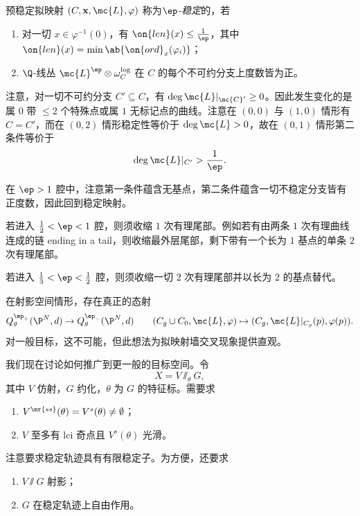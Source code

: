 \begin{defn}
    预稳定拟映射 \((C, \mathbf{x}, \mc{L}, \varphi)\) 称为\textit{\(\ep\)-稳定}的，若
    \begin{enumerate}
        \item 对一切 \(x \in \varphi^{-1}(0)\)，有 \(\on{len}(x) \leq \frac{1}{\ep}\)，其中 \(\on{len}(x) = \min \ab\{ \on{ord}_x (\varphi_i)\}\)；
        \item \(\Q\)-线丛 \(\mc{L}^{\ep} \otimes \omega_C^{\log}\) 在 \(C\) 的每个不可约分支上度数皆为正。
    \end{enumerate}
\end{defn}

注意，对一切不可约分支 \(C' \subseteq C\)，有 \(\deg \mc{L}|_{\mc{C}'} \geq 0\)。因此发生变化的是属 \(0\) 带 \(\leq 2\) 个特殊点或属 \(1\) 无标记点的曲线。注意在 \((0,0)\) 与 \((1,0)\) 情形有 \(C = C'\)，而在 \((0,2)\) 情形稳定性等价于 \(\deg \mc{L} > 0\)，故在 \((0,1)\) 情形第二条件等价于
\[ \deg \mc{L}|_{C'} > \frac{1}{\ep}. \]

\begin{exm}
    在 \(\ep > 1\) 腔中，注意第一条件蕴含无基点，第二条件蕴含一切不稳定分支皆有正度数，因此回到稳定映射。

    若进入 \(\frac{1}{2} < \ep < 1\) 腔，则须收缩 \(1\) 次有理尾部。例如若有由两条 \(1\) 次有理曲线连成的链 ending in a tail，则收缩最外层尾部，剩下带有一个长为 \(1\) 基点的单条 \(2\) 次有理尾部。

    若进入 \(\frac{1}{3} < \ep < \frac{1}{2}\) 腔，则须收缩一切 \(2\) 次有理尾部并以长为 \(2\) 的基点替代。
\end{exm}

\begin{rmk}
    在射影空间情形，存在真正的态射
    \[ Q_g^{\ep_+}(\P^N, d) \to Q_g^{\ep_-}(\P^N, d) \qquad (C_g \cup C_0, \mc{L}, \varphi) \mapsto (C_g, \mc{L}|_{C_g}(p), \varphi(p)). \]
    对一般目标，这不可能，但此想法为拟映射墙交叉现象提供直观。
\end{rmk}

我们现在讨论如何推广到更一般的目标空间。令
\[ X = V \sslash_{\theta} G, \]
其中 \(V\) 仿射，\(G\) 约化，\(\theta\) 为 \(G\) 的特征标。需要求
\begin{enumerate}
    \item \(V^{\mr{ss}}(\theta) = V^s(\theta) \neq \emptyset\)；
    \item \(V\) 至多有 lci 奇点且 \(V^s(\theta)\) 光滑。
\end{enumerate}
注意要求稳定轨迹具有有限稳定子。为方便，还要求
\begin{enumerate}
    \item \(V \sslash G\) 射影；
    \item \(G\) 在稳定轨迹上自由作用。
\end{enumerate}

